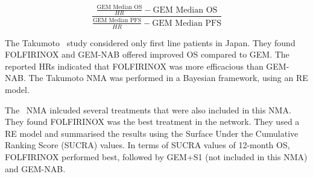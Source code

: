 \begin{equation}
    \frac{\frac{\text{GEM Median OS}}{HR}-\text{GEM Median OS}}{\frac{\text{GEM Median PFS}}{HR}-\text{GEM Median PFS}}
    \label{eq:gain}
\end{equation}

The Takumoto~\cite{takumoto} study considered only first line patients in Japan. They found FOLFIRINOX and GEM-NAB offered improved OS compared to GEM. The reported HRs indicated that FOLFIRINOX was more efficacious than GEM-NAB. The Takumoto NMA was performed in a Bayesian framework, using an RE model. 

The~\cite{zhang} NMA inlcuded several treatments that were also included in this NMA. They found FOLFIRINOX was the best treatment in the network. They used a RE model and summarised the results using the Surface Under the Cumulative Ranking Score (SUCRA) values. In terms of SUCRA values of 12-month OS, FOLFIRINOX performed best, followed by GEM+S1 (not included in this NMA) and GEM-NAB. 